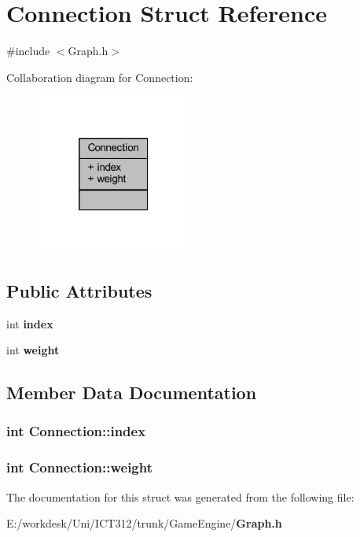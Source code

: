 \section{Connection Struct Reference}
\label{struct_connection}


{\ttfamily \#include $<$Graph.\+h$>$}



Collaboration diagram for Connection\+:
\nopagebreak
\begin{figure}[H]
\begin{center}
\leavevmode
\includegraphics[width=145pt]{d4/dd5/struct_connection__coll__graph}
\end{center}
\end{figure}
\subsection*{Public Attributes}
\begin{DoxyCompactItemize}
\item 
int {\bf index}
\item 
int {\bf weight}
\end{DoxyCompactItemize}


\subsection{Member Data Documentation}
\subsubsection[{index}]{\setlength{\rightskip}{0pt plus 5cm}int Connection\+::index}\label{struct_connection_af4df730fa6d4fe43b526a08709f83535}
\subsubsection[{weight}]{\setlength{\rightskip}{0pt plus 5cm}int Connection\+::weight}\label{struct_connection_a7e5fe8f637cade5d7209c527040b1633}


The documentation for this struct was generated from the following file\+:\begin{DoxyCompactItemize}
\item 
E\+:/workdesk/\+Uni/\+I\+C\+T312/trunk/\+Game\+Engine/{\bf Graph.\+h}\end{DoxyCompactItemize}
